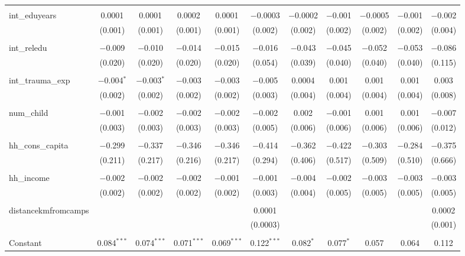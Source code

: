 \begin{table}[H]
\begin{tabular}{@{\extracolsep{4pt}}lcccccccccc}
  & & & & & & & & & & \\ 
 int\_eduyears & 0.0001 & 0.0001 & 0.0002 & 0.0001 & $-$0.0003 & $-$0.0002 & $-$0.001 & $-$0.0005 & $-$0.001 & $-$0.002 \\ 
  & (0.001) & (0.001) & (0.001) & (0.001) & (0.002) & (0.002) & (0.002) & (0.002) & (0.002) & (0.004) \\ 
  & & & & & & & & & & \\ 
 int\_reledu & $-$0.009 & $-$0.010 & $-$0.014 & $-$0.015 & $-$0.016 & $-$0.043 & $-$0.045 & $-$0.052 & $-$0.053 & $-$0.086 \\ 
  & (0.020) & (0.020) & (0.020) & (0.020) & (0.054) & (0.039) & (0.040) & (0.040) & (0.040) & (0.115) \\ 
  & & & & & & & & & & \\ 
 int\_trauma\_exp & $-$0.004$^{*}$ & $-$0.003$^{*}$ & $-$0.003 & $-$0.003 & $-$0.005 & 0.0004 & 0.001 & 0.001 & 0.001 & 0.003 \\ 
  & (0.002) & (0.002) & (0.002) & (0.002) & (0.003) & (0.004) & (0.004) & (0.004) & (0.004) & (0.008) \\ 
  & & & & & & & & & & \\ 
 num\_child & $-$0.001 & $-$0.002 & $-$0.002 & $-$0.002 & $-$0.002 & 0.002 & $-$0.001 & 0.001 & 0.001 & $-$0.007 \\ 
  & (0.003) & (0.003) & (0.003) & (0.003) & (0.005) & (0.006) & (0.006) & (0.006) & (0.006) & (0.012) \\ 
  & & & & & & & & & & \\ 
 hh\_cons\_capita & $-$0.299 & $-$0.337 & $-$0.346 & $-$0.346 & $-$0.414 & $-$0.362 & $-$0.422 & $-$0.303 & $-$0.284 & $-$0.375 \\ 
  & (0.211) & (0.217) & (0.216) & (0.217) & (0.294) & (0.406) & (0.517) & (0.509) & (0.510) & (0.666) \\ 
  & & & & & & & & & & \\ 
 hh\_income & $-$0.002 & $-$0.002 & $-$0.002 & $-$0.001 & $-$0.001 & $-$0.004 & $-$0.002 & $-$0.003 & $-$0.003 & $-$0.003 \\ 
  & (0.002) & (0.002) & (0.002) & (0.002) & (0.003) & (0.004) & (0.005) & (0.005) & (0.005) & (0.005) \\ 
  & & & & & & & & & & \\ 
 distancekmfromcamps &  &  &  &  & 0.0001 &  &  &  &  & 0.0002 \\ 
  &  &  &  &  & (0.0003) &  &  &  &  & (0.001) \\ 
  & & & & & & & & & & \\ 
 Constant & 0.084$^{***}$ & 0.074$^{***}$ & 0.071$^{***}$ & 0.069$^{***}$ & 0.122$^{***}$ & 0.082$^{*}$ & 0.077$^{*}$ & 0.057 & 0.064 & 0.112 \\ 

\end{tabular}
\end{table}
